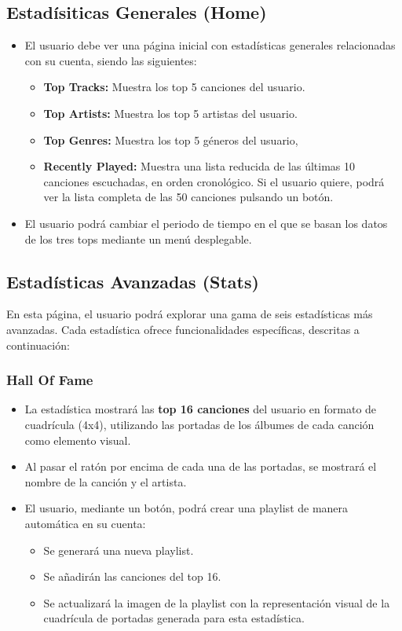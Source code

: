 \subsection{Estadísiticas Generales (Home)}
\begin{itemize}
    \item El usuario debe ver una página inicial con estadísticas generales relacionadas con su cuenta, siendo las siguientes:
          \begin{itemize}
              \item \textbf{Top Tracks:} Muestra los top 5 canciones del usuario.
              \item \textbf{Top Artists:} Muestra los top 5 artistas del usuario.
              \item \textbf{Top Genres:} Muestra los top 5 géneros del usuario,
              \item \textbf{Recently Played:} Muestra una lista reducida de las últimas 10 canciones escuchadas, en orden cronológico. Si el usuario quiere, podrá ver la lista completa de las 50 canciones pulsando un botón.
          \end{itemize}
    \item El usuario podrá cambiar el periodo de tiempo en el que se basan los datos de los tres tops mediante un menú desplegable.
\end{itemize}

\subsection{Estadísticas Avanzadas (Stats)}

En esta página, el usuario podrá explorar una gama de seis estadísticas más avanzadas. Cada estadística ofrece funcionalidades específicas, descritas a continuación:

\subsubsection*{Hall Of Fame}

\begin{itemize}
    \item La estadística mostrará las \textbf{top 16 canciones} del usuario en formato de cuadrícula (4x4), utilizando las portadas de los álbumes de cada canción como elemento visual.
    \item Al pasar el ratón por encima de cada una de las portadas, se mostrará el nombre de la canción y el artista.
    \item El usuario, mediante un botón, podrá crear una playlist de manera automática en su cuenta:
          \begin{itemize}
              \item Se generará una nueva playlist.
              \item Se añadirán las canciones del top 16.
              \item Se actualizará la imagen de la playlist con la representación visual de la cuadrícula de portadas generada para esta estadística.
          \end{itemize}
\end{itemize}

